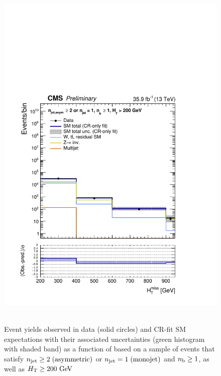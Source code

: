 \clearpage
\begin{figure}[h!]
  \centering
  \caption{Event yields observed in data (solid circles) and CR-fit SM expectations with their associated uncertainties 
  (green histogram with shaded band) as a function of \HTmiss based on a sample of events that satisfy 
  $n_{\text{jet}} \geq 2 \; \textrm{(asymmetric)}$ or $n_{\text{jet}} = 1 \; \textrm{(monojet)}$  and $n_{\text{b}} \geq 1$, as well as $\mbox{$H_\text{T}$} \geq 200 \textrm{ GeV}$ }
  \includegraphics[width=0.8\linewidth]{figures/results/36invfb_preapproval/aggregated/postFitShapeCR/mhtShape_ge1b_ge1j2a_200_Inf_crfit.pdf} ~
\end{figure}

